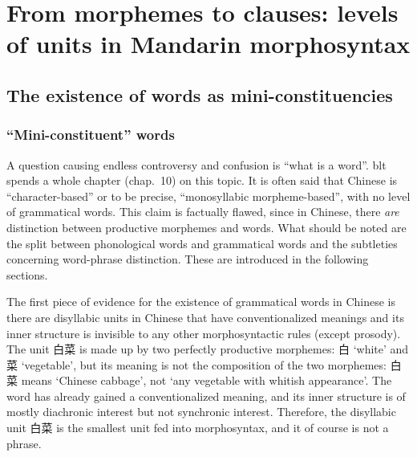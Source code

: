 \documentclass[UTF8, a4paper, oneside, scheme=plain]{ctexrep}
\newcommand*{\citechap}[1]{chap.~{#1}}
\newcommand*{\term}[1]{\emph{#1}}
\newcommand{\translate}[1]{`#1'}
\begin{document}
\section{From morphemes to clauses: levels of units in Mandarin morphosyntax}

\subsection{The existence of words as mini-constituencies}

\subsubsection{``Mini-constituent'' words}

A question causing endless controversy and confusion 
is ``what is a word''. 
\ac{blt} spends a whole chapter (\citechap{10}) on this topic.
It is often said that Chinese is ``character-based''
or to be precise, ``monosyllabic morpheme-based'',
with no level of grammatical words.
This claim is factually flawed, 
since in Chinese, there \term{are} distinction between 
productive morphemes and words.
What should be noted are the split between phonological words and grammatical words %
and the subtleties concerning word-phrase distinction. %
These are introduced in the following sections.

The first piece of evidence for the existence of grammatical words in Chinese is 
there are disyllabic units in Chinese 
that have conventionalized meanings and its inner structure is invisible 
to any other morphosyntactic rules (except prosody).
The unit 白菜 is made up by two perfectly productive morphemes:
白 \translate{white} and 菜 \translate{vegetable},
but its meaning is not the composition of the two morphemes:
白菜 means \translate{Chinese cabbage}, not \translate{any vegetable with whitish appearance}.
The word has already gained a conventionalized meaning,
and its inner structure is of mostly diachronic interest but not synchronic interest.
Therefore, the disyllabic unit 白菜 is the smallest unit fed into morphosyntax,
and it of course is not a phrase.
\end{document}
